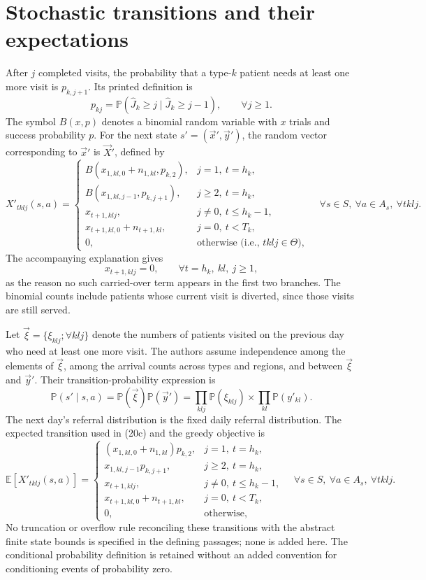 \documentclass{article}
\begin{document}
\section*{Stochastic transitions and their expectations}
After $j$ completed visits, the probability that a type-$k$ patient needs at least one more visit is $p_{k,j+1}$. Its printed definition is
\[
p_{kj}=\mathbb P(\hat J_k\geq j\mid\hat J_k\geq j-1),\qquad\forall j\geq1.
\]
The symbol $B(x,p)$ denotes a binomial random variable with $x$ trials and success probability $p$. For the next state $s'=(\vec x',\vec y')$, the random vector corresponding to $\vec x'$ is $\vec X'$, defined by
\begin{equation}
X'_{tklj}(s,a)=
\begin{cases}
B(x_{1,kl,0}+n_{1,kl},p_{k,2}),&j=1,\ t=h_k,\\
B(x_{1,kl,j-1},p_{k,j+1}),&j\geq2,\ t=h_k,\\
x_{t+1,klj},&j\neq0,\ t\leq h_k-1,\\
x_{t+1,kl,0}+n_{t+1,kl},&j=0,\ t<T_k,\\
0,&\text{otherwise (i.e., }tklj\in\Theta\text{)},
\end{cases}
\quad\forall s\in S,\ \forall a\in A_s,\ \forall tklj.
\tag{13}
\end{equation}
The accompanying explanation gives
\[
x_{t+1,klj}=0,\qquad\forall t=h_k,\ kl,\ j\geq1,
\]
as the reason no such carried-over term appears in the first two branches. The binomial counts include patients whose current visit is diverted, since those visits are still served.

Let $\vec\xi=\{\xi_{klj};\forall klj\}$ denote the numbers of patients visited on the previous day who need at least one more visit. The authors assume independence among the elements of $\vec\xi$, among the arrival counts across types and regions, and between $\vec\xi$ and $\vec y'$. Their transition-probability expression is
\[
\mathbb P(s'\mid s,a)
=\mathbb P(\vec\xi)\mathbb P(\vec y')
=\prod_{klj}\mathbb P(\xi_{klj})\times\prod_{kl}\mathbb P(y'_{kl}).
\]
The next day's referral distribution is the fixed daily referral distribution. The expected transition used in (20c) and the greedy objective is
\begin{equation}
\mathbb E[X'_{tklj}(s,a)]=
\begin{cases}
(x_{1,kl,0}+n_{1,kl})p_{k,2},&j=1,\ t=h_k,\\
x_{1,kl,j-1}p_{k,j+1},&j\geq2,\ t=h_k,\\
x_{t+1,klj},&j\neq0,\ t\leq h_k-1,\\
x_{t+1,kl,0}+n_{t+1,kl},&j=0,\ t<T_k,\\
0,&\text{otherwise},
\end{cases}
\quad\forall s\in S,\ \forall a\in A_s,\ \forall tklj.
\tag{19}
\end{equation}
No truncation or overflow rule reconciling these transitions with the abstract finite state bounds is specified in the defining passages; none is added here. The conditional probability definition is retained without an added convention for conditioning events of probability zero.
\end{document}
